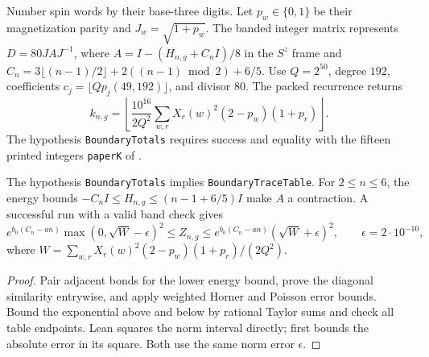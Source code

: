 \begin{definition}
  \label{def:boundary-totals}
  \leanok
  Number spin words by their base-three digits. Let \(p_w\in\{0,1\}\) be their magnetization
  parity and \(J_w=\sqrt{1+p_w}\).
  The banded integer matrix represents \(D=80JAJ^{-1}\), where
  \(A=I-(H_{n,g}+C_nI)/8\) in the \(S^z\) frame and
  \(C_n=3\lfloor(n-1)/2\rfloor+2((n-1)\bmod2)+6/5\).
  Use \(Q=2^{50}\), degree \(192\), coefficients
  \(c_j=\lfloor Qp_j(49,192)\rfloor\), and divisor \(80\).
  The packed recurrence returns
  \[
    k_{n,g}=\left\lfloor
    \frac{10^{16}}{2Q^2}\sum_{w,r}X_r(w)^2(2-p_w)(1+p_r)\right\rfloor.
  \]
  The hypothesis \texttt{BoundaryTotals} requires success and equality with the fifteen
  printed integers \texttt{paperK} of \cite[equation (A.12)]{OpenAIBoundary}.
\end{definition}

\begin{theorem}
  \label{thm:boundary-table}
  \leanok
  The hypothesis \texttt{BoundaryTotals} implies \texttt{BoundaryTraceTable}.
  For \(2\le n\le6\), the energy bounds
  \(-C_nI\le H_{n,g}\le(n-1+6/5)I\) make \(A\) a contraction.
  A successful run with a valid band check gives
  \[
    e^{b_0(C_n-an)}\max(0,\sqrt W-\epsilon)^2
    \le Z_{n,g}\le
    e^{b_0(C_n-an)}(\sqrt W+\epsilon)^2,
    \qquad \epsilon=2\cdot10^{-10},
  \]
  where \(W=\sum_{w,r}X_r(w)^2(2-p_w)(1+p_r)/(2Q^2)\).
\end{theorem}
\begin{proof}
  \leanok
  Pair adjacent bonds for the lower energy bound, prove the diagonal similarity entrywise,
  and apply weighted Horner and Poisson error bounds.
  Bound the exponential above and below by rational Taylor sums and check all table endpoints.
  Lean squares the norm interval directly; \cite[Appendix A.4]{OpenAIBoundary} first bounds
  the absolute error in its square. Both use the same norm error \(\epsilon\).
\end{proof}

